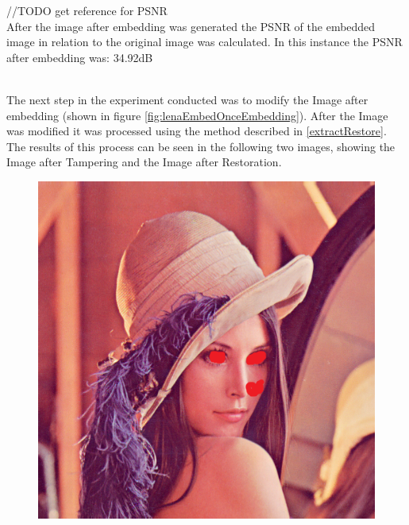 \documentclass[12pt]{article}
\begin{document}
//TODO get reference for PSNR
\hspace{0pt} \\
After the image after embedding was generated the PSNR of the embedded image in relation to the original image was calculated.
In this instance the PSNR after embedding was: 34.92dB 

\hspace{0pt} \\
The next step in the experiment conducted was to modify the Image after embedding (shown in figure \ref{fig:lenaEmbedOnceEmbedding}).
After the Image was modified it was processed using the method described in \ref{extractRestore}.
The results of this process can be seen in the following two images, showing the Image after Tampering and the Image after Restoration.

\begin{figure}[h]
\centerline{%
\includegraphics[scale=0.45]{"Lena Embed once 0.7 threshold/finalImage - Copy"}%
\hspace{0.1cm}
}
\end{figure}
\end{document}
